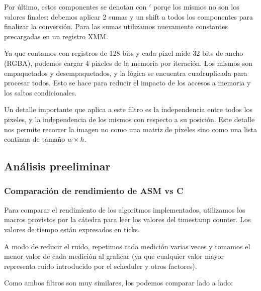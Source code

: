 Por último, estos componentes se denotan con $'$ porqe los mismos no son los valores finales: debemos aplicar 2 sumas y un shift a todos los componentes para finalizar la conversión. Para las sumas utilizamos nuevamente constantes precargadas en un registro XMM.

Ya que contamos con registros de 128 bits y cada pixel mide 32 bits de ancho (RGBA), podemos cargar 4 pixeles de la memoria por iteración. Los mismos son empaquetados y desempaquetados, y la lógica se encuentra cuadruplicada para procesar todos. Esto se hace para reducir el impacto de los accesos a memoria y los saltos condicionales.

Un detalle importante que aplica a este filtro es la independencia entre todos los pixeles, y la independencia de los mismos con respecto a su posición. Este detalle nos permite recorrer la imagen no como una matriz de pixeles sino como una lista continua de tamaño $w \times h$.


\subsection{Análisis preeliminar}
\subsubsection*{Comparación de rendimiento de ASM vs C}

Para comparar el rendimiento de los algoritmos implementados, utilizamos los macros provistos por la cátedra para leer los valores del timestamp counter. Los valores de tiempo están expresados en ticks.

A modo de reducir el ruido, repetimos cada medición varias veces y tomamos el menor valor de cada medición al graficar (ya que cualquier valor mayor representa ruido introducido por el scheduler y otros factores).

Como ambos filtros son muy similares, los podemos comparar lado a lado:

